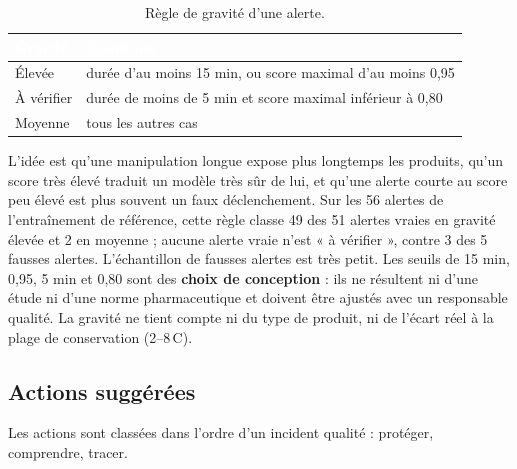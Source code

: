 \begin{table}[H]
\centering
\small
\renewcommand{\arraystretch}{1.3}
\caption{Règle de gravité d'une alerte.}
\label{tab:expl_gravite}
\begin{tabular}{|l|l|}
\hline
\rowcolor{thead}
\textcolor{white}{\textbf{Gravité}} & \textcolor{white}{\textbf{Condition}} \\
\hline
Élevée & durée d'au moins 15 min, ou score maximal d'au moins 0,95 \\
\rowcolor{trowa}
À vérifier & durée de moins de 5 min et score maximal inférieur à 0,80 \\
Moyenne & tous les autres cas \\
\hline
\end{tabular}
\end{table}

L'idée est qu'une manipulation longue expose plus longtemps les produits, qu'un
score très élevé traduit un modèle très sûr de lui, et qu'une alerte courte au
score peu élevé est plus souvent un faux déclenchement. Sur les 56 alertes de
l'entraînement de référence, cette règle classe 49 des 51 alertes vraies en
gravité élevée et 2 en moyenne ; aucune alerte vraie n'est « à vérifier », contre
3 des 5 fausses alertes. L'échantillon de fausses alertes est très petit. Les
seuils de 15 min, 0,95, 5 min et 0,80 sont des \textbf{choix de conception} : ils
ne résultent ni d'une étude ni d'une norme pharmaceutique et doivent être
ajustés avec un responsable qualité. La gravité ne tient compte ni du type de produit, ni de l'écart réel à
la plage de conservation (2--8\,\textdegree C).

\subsection{Actions suggérées}

Les actions sont classées dans l'ordre d'un incident qualité : protéger,
comprendre, tracer.

